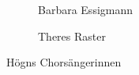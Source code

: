 \begin{figure}
\begin{subfigure}[b]{0.5\linewidth}
\centering
{}
\caption{Barbara Essigmann}
\end{subfigure}
%
\begin{subfigure}[b]{0.5\linewidth}
\centering
{}
\caption{Theres Raster}
\end{subfigure}
%
\caption{Högns Chorsängerinnen}
\end{figure}
